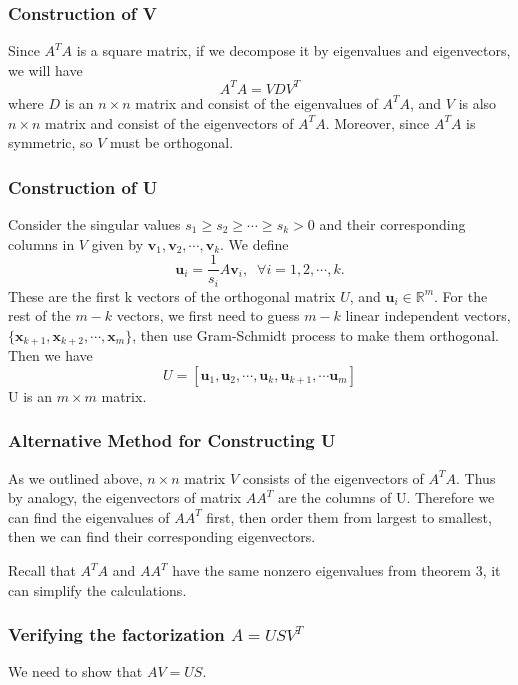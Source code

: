 \subsubsection*{Construction of V}
Since $A^TA$ is a square matrix, if we decompose it by eigenvalues and eigenvectors, we will have
\[ A^TA = VDV^T \]
where $D$ is an $n\times n$ matrix and consist of the eigenvalues of $A^TA$, and $V$ is also $n\times n$ matrix and consist of the eigenvectors of $A^TA$. Moreover, since $A^TA$ is symmetric, so $V$ must be orthogonal. 

\subsubsection*{Construction of U}
Consider the singular values $s_1 \geq s_2 \geq \cdots \geq s_k > 0$ and their corresponding columns in $V$ given by $\mathbf{v}_1, \mathbf{v}_2,\cdots , \mathbf{v}_k$. We define
\[ \mathbf{u}_i = \frac{1}{s_i} A \mathbf{v}_i,\;\;\forall i=1,2,\cdots, k. \]
These are the first k vectors of the orthogonal matrix $U$, and $\mathbf{u}_i\in\mathbb{R}^m$. For the rest of the $m-k$ vectors, we first need to guess $m-k$ linear independent vectors, $\{\mathbf{x}_{k+1},\mathbf{x}_{k+2}, \cdots, \mathbf{x}_m \}$, then use Gram-Schmidt process to make them orthogonal. Then we have 
\[ U = [\mathbf{u}_1, \mathbf{u}_2, \cdots, \mathbf{u}_k, \mathbf{u}_{k+1}, \cdots \mathbf{u}_m] \]
U is an $m\times m$ matrix.

\subsubsection*{Alternative Method for Constructing U}
As we outlined above, $n\times n$ matrix $V$ consists of the eigenvectors of $A^TA$. Thus by analogy, the eigenvectors of matrix $AA^T$ are the columns of U. Therefore we can find the eigenvalues of $AA^T$ first, then order them from largest to smallest, then we can find their corresponding eigenvectors.

Recall that $A^TA$ and $AA^T$ have the same nonzero eigenvalues from theorem 3, it can simplify the calculations.
  
\subsubsection*{Verifying the factorization $A=USV^T$}
We need to show that $AV = US$.

